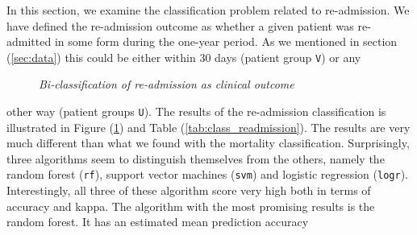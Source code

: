 \documentclass[../thesis.tex]{subfiles}
\begin{document}
\noindent In this section, we examine the classification problem related to re-admission. We have defined the re-admission outcome as whether a given patient was re-admitted in some form during the one-year period. As we mentioned in section (\ref{sec:data}) this could be either within 30 days (patient group \texttt{V}) or any

\begin{figure}[h!]
    \centering
    \scalebox{.8}{}
    \caption[Bi-classification of re-admission as clinical outcome]{\textit{Bi-classification of re-admission as clinical outcome}}
    \label{fig:bi_class_read}
\end{figure}

\noindent other way (patient groups \texttt{U}). The results of the re-admission classification is illustrated in Figure (\ref{fig:bi_class_read}) and Table (\ref{tab:class_readmission}). The results are very much different than what we found with the mortality classification. Surprisingly, three algorithms seem to distinguish themselves from the others, namely the random forest (\texttt{rf}), support vector machines (\texttt{svm}) and logistic regression (\texttt{logr}). Interestingly, all three of these algorithm score very high both in terms of accuracy and kappa. The algorithm with the most promising results is the random forest. It has an estimated mean prediction accuracy

\vspace*{-0,1cm}
\end{document}
